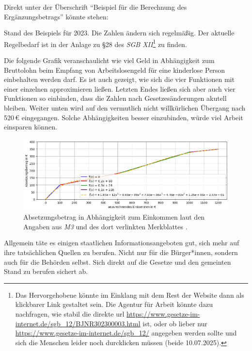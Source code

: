 \begin{myenumerate}
    Direkt unter der Überschrift \enquote{Beispiel für die Berechnung des Ergänzungsbetrags} könnte stehen:


    Stand des Beispiels für 2023. Die Zahlen ändern sich regelmäßig. Der aktuelle Regelbedarf ist in der Anlage zu §28 des \emph{SGB XII}\footnote{
        Das Hervorgehobene könnte im Einklang mit dem Rest der Website dann als klickbarer Link gestaltet sein. Die Agentur für Arbeit könnte dazu nachfragen, wie stabil die direkte \gls{url} \url{https://www.gesetze-im-internet.de/sgb_12/BJNR302300003.html} ist, oder ob lieber nur \url{https://www.gesetze-im-internet.de/sgb_12/} angegeben werden sollte und sich die Menschen leider noch durcklicken müssen (beide 10.07.2025).} zu finden.
\end{myenumerate}

Die folgende Grafik veranschaulicht wie viel Geld in Abhängigkeit zum Bruttolohn beim Empfang von Arbeitslosengeld für eine kinderlose Person einbehalten werden darf. Es ist auch gezeigt, wie sich die vier Funktionen mit einer einzelnen approximieren ließen. Letzten Endes ließen sich aber auch vier Funktionen so einbinden, dass die Zahlen nach Gesetzesänderungen akutell bleiben. Weiter unten wird auf den vermutlich nicht willkürlichen Übergang nach 520\,€ eingegangen. Solche Abhängigkeiten besser einzubinden, würde viel Arbeit einsparen können. 
\begin{figure}[h!]
    \centering
    \includegraphics[width=1\linewidth]{Absetzungsbetrag.png}
    \caption{Absetzungsbetrag in Abhängigkeit zum Einkommen laut den Angaben aus \emph{M3} und des dort verlinkten Merkblattes \autocite[59-62]{MerkblattSGBII}.}
    \label{Absetzungsbetrag}
\end{figure}

Allgemein täte es einigen staatlichen Informationsangeboten gut, sich mehr auf ihre tatsächlichen Quellen zu berufen. Nicht nur für die Bürger*innen, sondern auch für die Behörden selbst. Sich direkt auf die Gesetze und den gemeinten Stand zu berufen sichert ab.

